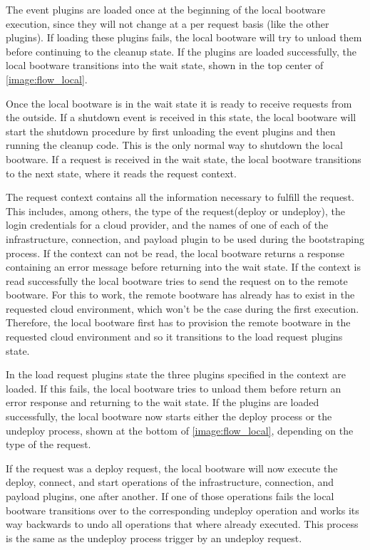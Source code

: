 The event plugins are loaded once at the beginning of the local bootware execution, since they will not change at a per request basis (like the other plugins).
If loading these plugins fails, the local bootware will try to unload them before continuing to the cleanup state.
If the plugins are loaded successfully, the local bootware transitions into the wait state, shown in the top center of \autoref{image:flow_local}.

Once the local bootware is in the wait state it is ready to receive requests from the outside.
If a shutdown event is received in this state, the local bootware will start the shutdown procedure by first unloading the event plugins and then running the cleanup code.
This is the only normal way to shutdown the local bootware.
If a request is received in the wait state, the local bootware transitions to the next state, where it reads the request context.

The request context contains all the information necessary to fulfill the request.
This includes, among others, the type of the request(deploy or undeploy), the login credentials for a cloud provider, and the names of one of each of the infrastructure, connection, and payload plugin to be used during the bootstraping process.
If the context can not be read, the local bootware returns a response containing an error message before returning into the wait state.
If the context is read successfully the local bootware tries to send the request on to the remote bootware.
For this to work, the remote bootware has already has to exist in the requested cloud environment, which won't be the case during the first execution.
Therefore, the local bootware first has to provision the remote bootware in the requested cloud environment and so it transitions to the load request plugins state.

In the load request plugins state the three plugins specified in the context are loaded.
If this fails, the local bootware tries to unload them before return an error response and returning to the wait state.
If the plugins are loaded successfully, the local bootware now starts either the deploy process or the undeploy process, shown at the bottom of \autoref{image:flow_local}, depending on the type of the request.

If the request was a deploy request, the local bootware will now execute the deploy, connect, and start operations of the infrastructure, connection, and payload plugins, one after another.
If one of those operations fails the local bootware transitions over to the corresponding undeploy operation and works its way backwards to undo all operations that where already executed.
This process is the same as the undeploy process trigger by an undeploy request.

